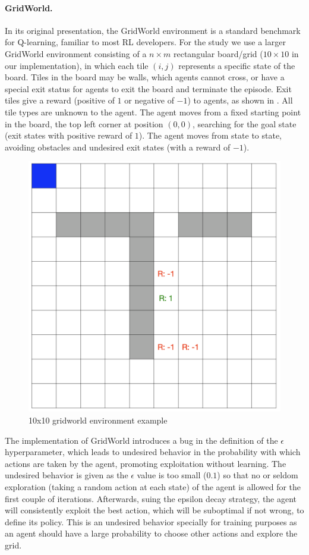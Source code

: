 \paragraph{\textbf{GridWorld.}}
In its original presentation, the GridWorld environment is a standard benchmark for Q-learning, 
familiar to most \ac{RL} developers. For the study we use a larger GridWorld environment consisting 
of a $n \times m$ rectangular  board/grid ($10\times 10$ in our implementation), in which each tile 
$(i,j)$ represents a specific state of the board. Tiles in the board may be  walls, which agents cannot 
cross, or have a special exit status for agents to exit the board and terminate the episode. Exit tiles 
give a reward (positive of $1$ or negative of $-1$) to agents, as shown in . All tile 
types are unknown to the agent. The agent moves from a fixed starting point in the board, the top left 
corner at position $(0,0)$, searching for the goal state (\ie exit states with positive reward of $1$). The 
agent moves from state to state, avoiding  obstacles and undesired exit states (with a reward of $-1$). 

\begin{figure}[hptb]
  \centering
  \includegraphics[width=0.5\columnwidth]{figures/gridworld.png}
  \caption{10x10 gridworld environment example}
  \label{fig:gridworld}
\end{figure}

The implementation of GridWorld introduces a bug in the definition of the $\epsilon$ hyperparameter, 
which leads to undesired behavior in the probability with which actions are taken by the agent, 
promoting exploitation without learning. The undesired behavior is given as the $\epsilon$ value is too 
small (\eg $0.1$) so that no or seldom exploration (taking a random action at each state) of the agent 
is allowed for the first couple of iterations. Afterwards, suing the epsilon decay strategy, the agent will 
consistently exploit the best action, which will be suboptimal if not wrong, to define its policy. This is 
an undesired behavior specially for training purposes as an agent should have a large probability to 
choose other actions and explore the grid. 

